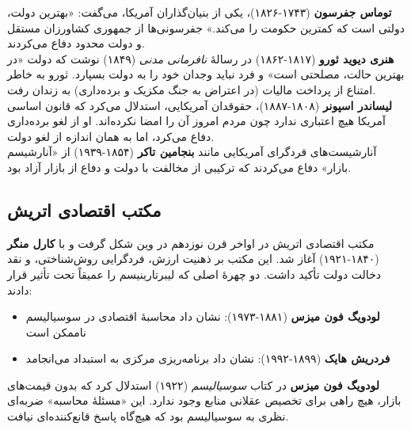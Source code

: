 \textbf{توماس جفرسون} (۱۷۴۳-۱۸۲۶)، یکی از بنیان‌گذاران آمریکا، می‌گفت: «بهترین دولت، دولتی است که کمترین حکومت را می‌کند.» جفرسونی‌ها از جمهوری کشاورزان مستقل و دولت محدود دفاع می‌کردند.\\

\textbf{هنری دیوید ثورو} (۱۸۱۷-۱۸۶۲) در رسالهٔ \textit{نافرمانی مدنی} (۱۸۴۹) نوشت که دولت «در بهترین حالت، مصلحتی است» و فرد نباید وجدان خود را به دولت بسپارد. ثورو به خاطر امتناع از پرداخت مالیات (در اعتراض به جنگ مکزیک و برده‌داری) به زندان رفت.\\

\textbf{لیساندر اسپونر} (۱۸۰۸-۱۸۸۷)، حقوقدان آمریکایی، استدلال می‌کرد که قانون اساسی آمریکا هیچ اعتباری ندارد چون مردم امروز آن را امضا نکرده‌اند. او از لغو برده‌داری دفاع می‌کرد، اما به همان اندازه از لغو دولت.\\

آنارشیست‌های فردگرای آمریکایی مانند \textbf{بنجامین تاکر} (۱۸۵۴-۱۹۳۹) از «آنارشیسم بازار» دفاع می‌کردند که ترکیبی از مخالفت با دولت و دفاع از بازار آزاد بود.\\

\subsection{مکتب اقتصادی اتریش}

\begin{tcolorbox}[
    enhanced,
    colback=goldaccent!10,
    colframe=goldaccent,
    boxrule=1.5pt,
    arc=5pt,
    fonttitle=\bfseries,
    title={\rl{🟡 زمینهٔ تاریخی: مکتب اتریش}}
]
مکتب اقتصادی اتریش در اواخر قرن نوزدهم در وین شکل گرفت و با \textbf{کارل منگر} (۱۸۴۰-۱۹۲۱) آغاز شد. این مکتب بر ذهنیت ارزش، فردگرایی روش‌شناختی، و نقد دخالت دولت تأکید داشت. دو چهرهٔ اصلی که لیبرتارینیسم را عمیقاً تحت تأثیر قرار دادند:

\begin{itemize}
    \item \textbf{لودویگ فون میزس} (۱۸۸۱-۱۹۷۳): نشان داد محاسبهٔ اقتصادی در سوسیالیسم ناممکن است
    \item \textbf{فردریش هایک} (۱۸۹۹-۱۹۹۲): نشان داد برنامه‌ریزی مرکزی به استبداد می‌انجامد
\end{itemize}
\end{tcolorbox}



\textbf{لودویگ فون میزس} در کتاب \textit{سوسیالیسم} (۱۹۲۲) استدلال کرد که بدون قیمت‌های بازار، هیچ راهی برای تخصیص عقلانی منابع وجود ندارد. این «مسئلهٔ محاسبه» ضربه‌ای نظری به سوسیالیسم بود که هیچ‌گاه پاسخ قانع‌کننده‌ای نیافت.\\

